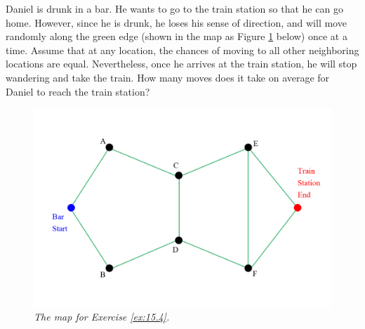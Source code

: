 \begin{Exercise}
\label{ex:15.4}
Daniel is drunk in a bar. He wants to go to the train station so that he can go home. However, since he is drunk, he loses his sense of direction, and will move randomly along the green edge (shown in the map as Figure \ref{fig:ex15.4} below) once at a time. Assume that at any location, the chances of moving to all other neighboring locations are equal. Nevertheless, once he arrives at the train station, he will stop wandering and take the train. How many moves does it take on average for Daniel to reach the train station?
\begin{figure}
    \centering
    \includegraphics[scale = 0.3]{graphics/wander.png}
    \caption{\textit{The map for Exercise \ref{ex:15.4}.}}
    \label{fig:ex15.4}
\end{figure}
\end{Exercise}
